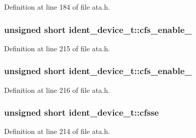 Definition at line 184 of file ata.\+h.

\subsubsection[{\texorpdfstring{cfs\+\_\+enable\+\_\+1}{cfs_enable_1}}]{\setlength{\rightskip}{0pt plus 5cm}unsigned short ident\+\_\+device\+\_\+t\+::cfs\+\_\+enable\+\_}\hypertarget{structident__device__t_a0ec1d5bb87dd9448de785f41e9c227bb}{}\label{structident__device__t_a0ec1d5bb87dd9448de785f41e9c227bb}


Definition at line 215 of file ata.\+h.

\subsubsection[{\texorpdfstring{cfs\+\_\+enable\+\_\+2}{cfs_enable_2}}]{\setlength{\rightskip}{0pt plus 5cm}unsigned short ident\+\_\+device\+\_\+t\+::cfs\+\_\+enable\+\_}\hypertarget{structident__device__t_a9c56b377c273470a41e0c13b9681fe9e}{}\label{structident__device__t_a9c56b377c273470a41e0c13b9681fe9e}


Definition at line 216 of file ata.\+h.

\subsubsection[{\texorpdfstring{cfsse}{cfsse}}]{\setlength{\rightskip}{0pt plus 5cm}unsigned short ident\+\_\+device\+\_\+t\+::cfsse}\hypertarget{structident__device__t_a471a93b5ad51421739da90fb7411098c}{}\label{structident__device__t_a471a93b5ad51421739da90fb7411098c}


Definition at line 214 of file ata.\+h.

